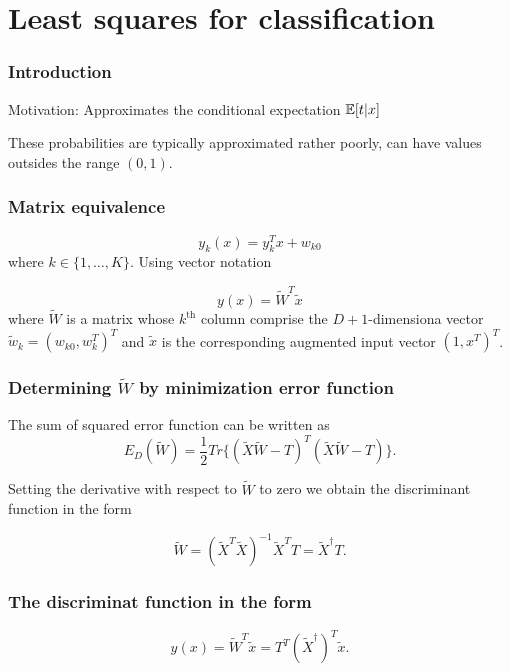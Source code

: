 \section{Least squares for classification}

\begin{frame}
    \frametitle{Introduction}
Motivation: Approximates the conditional expectation $\mathbb{E}[t|x]$
    
These probabilities are typically approximated rather poorly, can have values outsides the range
$(0,1)$. 
\end{frame}

\begin{frame}
    \frametitle{Matrix equivalence}

    \begin{equation}
        y_k(x) = 
        y^T_{k}x + w_{k 0}
    \end{equation}
    where $k \in \{1, \ldots, K\}.$
    Using vector notation

    \begin{equation}
        y(x)
        = 
        \tilde{W}^T \tilde{x}
    \end{equation}
    where $\tilde{W}$ is a matrix whose $k^\text{th}$ column comprise the 
    $D+1$-dimensiona vector
    $\tilde{w}_k = (w_{k 0}, w^T_k)^T$
    and $\tilde{x}$ is the corresponding 
    augmented input vector $(1,x^T)^T$. 
\end{frame}

\begin{frame}
    \frametitle{Determining $\tilde{W}$ by minimization error function}

    The sum of squared error function can be written as 
    \begin{equation}
        E_D(\tilde{W})
        = 
        \frac{1}{2}
        Tr
        \{
            (\tilde{X} \tilde{W} - T)^T
            (\tilde{X} \tilde{W} - T)
        \}.
    \end{equation}


    Setting the derivative with respect to 
    $\tilde W$ to zero we obtain the discriminant function in the form

    \begin{equation}
        \tilde W 
        = 
        (\tilde{X}^T\tilde{X})^{-1}
        \tilde{X}^T T 
        = 
        \tilde{X}^\dagger T.   
    \end{equation}
\end{frame}

\begin{frame}
    \frametitle{The discriminat function in the form}
    \begin{equation}
        y(x)
        =
        \tilde{W}^T \tilde{x}
        =
        T^T 
        \left(
            \tilde{X}^\dagger 
        \right)^T
        \tilde{x}.
    \end{equation}
\end{frame}

